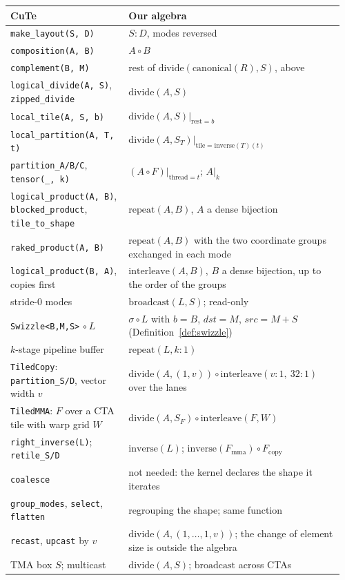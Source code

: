 \documentclass[11pt]{article}
\theoremstyle{definition}
\newcommand{\divideop}{\mathrm{divide}}
\newcommand{\repeatop}{\mathrm{repeat}}
\newcommand{\interleave}{\mathrm{interleave}}
\newcommand{\broadcast}{\mathrm{broadcast}}
\begin{document}
\begin{center}\small
\begin{tabular}{@{}p{0.34\linewidth}p{0.62\linewidth}@{}}
\toprule
\textbf{CuTe} & \textbf{Our algebra} \\
\midrule
\texttt{make\_layout(S, D)} & $S{:}D$, modes reversed \\
\texttt{composition(A, B)} & $A \circ B$ \\
\texttt{complement(B, M)} & rest of $\divideop(\mathrm{canonical}(R), S)$, above \\
\texttt{logical\_divide(A, S)}, \texttt{zipped\_divide} & $\divideop(A, S)$ \\
\texttt{local\_tile(A, S, b)} & $\divideop(A,S)\big|_{\mathrm{rest} = b}$ \\
\texttt{local\_partition(A, T, t)} & $\divideop(A, S_T)\big|_{\mathrm{tile} = \mathrm{inverse}(T)(t)}$ \\
\texttt{partition\_A/B/C}, \texttt{tensor(\_, k)} & $(A \circ F)\big|_{\mathrm{thread} = t}$; $A\big|_{k}$ \\
\texttt{logical\_product(A, B)}, \texttt{blocked\_product}, \texttt{tile\_to\_shape} & $\repeatop(A, B)$, $A$ a dense bijection \\
\texttt{raked\_product(A, B)} & $\repeatop(A, B)$ with the two coordinate groups exchanged in each mode \\
\texttt{logical\_product(B, A)}, copies first & $\interleave(A, B)$, $B$ a dense bijection, up to the order of the groups \\
stride-$0$ modes & $\broadcast(L, S)$; read-only \\
\texttt{Swizzle<B,M,S>} $\circ\ L$ & $\sigma \circ L$ with $b = B$, $\mathit{dst} = M$, $\mathit{src} = M{+}S$ (Definition~\ref{def:swizzle}) \\
$k$-stage pipeline buffer & $\repeatop(L, k{:}1)$ \\
\texttt{TiledCopy}: \texttt{partition\_S/D}, vector width $v$ & $\divideop(A, (1,v)) \circ \interleave(v{:}1,\ 32{:}1)$ over the lanes \\
\texttt{TiledMMA}: $F$ over a CTA tile with warp grid $W$ & $\divideop(A, S_F) \circ \interleave(F, W)$ \\
\texttt{right\_inverse(L)}; \texttt{retile\_S/D} & $\mathrm{inverse}(L)$; $\mathrm{inverse}(F_{\mathrm{mma}}) \circ F_{\mathrm{copy}}$ \\
\texttt{coalesce} & not needed: the kernel declares the shape it iterates \\
\texttt{group\_modes}, \texttt{select}, \texttt{flatten} & regrouping the shape; same function \\
\texttt{recast}, \texttt{upcast} by $v$ & $\divideop(A, (1,\dots,1,v))$; the change of element size is outside the algebra \\
TMA box $S$; multicast & $\divideop(A, S)$; $\broadcast$ across CTAs \\
\bottomrule
\end{tabular}
\end{center}
\end{document}
